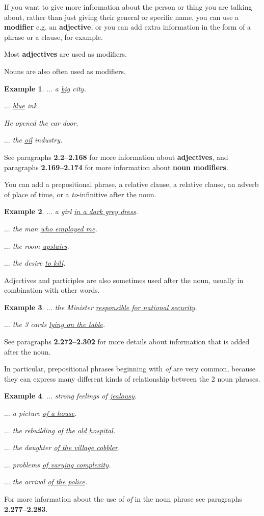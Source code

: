 \documentclass[oneside]{book}
\numberwithin{equation}{section}
\newtheorem{example}{Example}[section]
\begin{document}
%
\noindent{} If you want to give more information about the person or thing you are talking about, rather than just giving their general or specific name, you can use a \textbf{modifier} e.g. an \textbf{adjective}, or you can add extra information in the form of a phrase or a clause, for example.

%
\noindent{} Most \textbf{adjectives} are used as modifiers.

Nouns are also often used as modifiers.
\begin{example}
    $\ldots$ a \underline{big} city.
    
    $\ldots$ \underline{blue} ink.
    
    He opened the car door.
    
    $\ldots$ the \underline{oil} industry.
\end{example}
See paragraphs \textbf{2.2--2.168} for more information about \textbf{adjectives}, and paragraphs \textbf{2.169--2.174} for more information about \textbf{noun modifiers}.

%
\noindent{} You can add a prepositional phrase, a relative clause, a relative clause, an adverb of place of time, or a \textit{to}-infinitive after the noun.
\begin{example}
    $\ldots$ a girl \underline{in a dark grey dress}.
    
    $\ldots$ the man \underline{who employed me}.
    
    $\ldots$ the room \underline{upstairs}.
    
    $\ldots$ the desire \underline{to kill}.
\end{example}
Adjectives and participles are also sometimes used after the noun, usually in combination with other words.
\begin{example}
    $\ldots$ the Minister \underline{responsible for national security}.
    
    $\ldots$ the 3 cards \underline{lying on the table}.
\end{example}
See paragraphs \textbf{2.272--2.302} for more details about information that is added after the noun.

%
\noindent{} In particular, prepositional phrases beginning with \textit{of} are very common, because they can express many different kinds of relationship between the 2 noun phrases.
\begin{example}
    $\ldots$ strong feelings of \underline{jealousy}.
    
    $\ldots$ a picture \underline{of a house}.
    
    $\ldots$ the rebuilding \underline{of the old hospital}.
    
    $\ldots$ the daughter \underline{of the village cobbler}.
    
    $\ldots$ problems \underline{of varying complexity}.
    
    $\ldots$ the arrival \underline{of the police}.
\end{example}
For more information about the use of \textit{of} in the noun phrase see paragraphs \textbf{2.277--2.283}.
\end{document}
